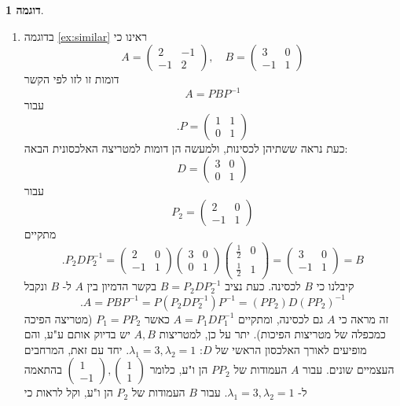 \documentclass[12pt]{report}
\theoremstyle{plain}
\theoremstyle{definition}
\newtheorem{example}{דוגמה}[chapter]
\newcommand{\0}{\mathbf{0}}
\begin{document}
\begin{example}
\begin{enumerate}[label=\alph*.]
\item 
בדוגמה 
\ref{ex:similar}
ראינו כי
$$
A=\begin{pmatrix}
2 & -1 \\
-1 & 2
\end{pmatrix},\quad B=\begin{pmatrix}
3 & 0 \\
-1 & 1
\end{pmatrix}
$$
דומות זו לזו לפי הקשר
$$
A=PBP^{-1}
$$
עבור
$$
.P=\begin{pmatrix}
1 & 1 \\
0 & 1
\end{pmatrix}
$$
כעת נראה ששתיהן לכסינות, ולמעשה הן דומות למטריצה האלכסונית הבאה:
$$
D=\begin{pmatrix}
3 & 0 \\
0 & 1
\end{pmatrix}
$$
עבור
$$
P_2=\begin{pmatrix}
2 & 0 \\
-1 & 1
\end{pmatrix}
$$
מתקיים
$$
.P_2DP_2^{-1}=\begin{pmatrix}
2 & 0 \\
-1 & 1
\end{pmatrix}\begin{pmatrix}
3 & 0 \\
0 & 1
\end{pmatrix}\begin{pmatrix}
\frac{1}{2} & 0 \\
\frac{1}{2} & 1
\end{pmatrix}=\begin{pmatrix}
3 & 0 \\
-1 & 1
\end{pmatrix}=B
$$
קיבלנו כי
$B$
לכסינה. כעת נציב 
$B=P_2DP_2^{-1}$
בקשר הדמיון בין
$A$
ל-
$B$
ונקבל
$$
.A=PBP^{-1}=P(P_2DP_2^{-1})P^{-1}=(PP_2)D(PP_2)^{-1}
$$
זה מראה כי
$A$
גם לכסינה, ומתקיים
$A=P_1DP_1^{-1}$
כאשר
$P_1=PP_2$
(מטריצה הפיכה כמכפלה של מטריצות הפיכות).
יתר על כן, למטריצות
$A,B$
יש בדיוק אותם ע"ע, והם מופיעים לאורך האלכסון הראשי של
$D$:
$\lambda_1=3,\lambda_2=1$.
יחד עם זאת, המרחבים העצמיים שונים. עבור 
$A$
העמודות של 
$PP_2$
הן ו"ע, כלומר
$\begin{pmatrix}1\\-1\end{pmatrix},\begin{pmatrix}1\\1\end{pmatrix}$
בהתאמה ל-
$\lambda_1=3,\lambda_2=1$.
עבור 
$B$
העמודות של 
$P_2$
הן ו"ע, וקל לראות כי

\end{enumerate}
\end{example}
\end{document}
